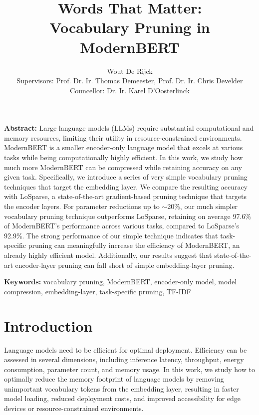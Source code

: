\documentclass[twocolumn]{article}
\title{\vspace{-1.5cm}\huge \textbf{Words That Matter:\\ Vocabulary Pruning in ModernBERT}}
\author{
Wout De Rijck\\[0.5em]
\small{Supervisors:} \normalsize Prof. Dr. Ir. Thomas Demeester, \normalsize Prof. Dr. Ir. Chris Develder\\
\small{Councellor:} \normalsize Dr. Ir. Karel D'Oosterlinck
}
\date{} %
\begin{document}
\maketitle


\textbf{Abstract:} Large language models (LLMs) require substantial computational and memory resources, limiting their utility in resource-constrained environments. 
ModernBERT is a smaller encoder-only language model that excels at various tasks while being computationally highly efficient. 
In this work, we study how much more ModernBERT can be compressed while retaining accuracy on any given task.
Specifically, we introduce a series of very simple vocabulary pruning techniques that target the embedding layer. We compare the resulting accuracy with LoSparse, a state-of-the-art gradient-based pruning technique that targets the encoder layers.
For parameter reductions up to $\sim$20\%, our much simpler vocabulary pruning technique outperforms LoSparse, retaining on average 97.6\% of ModernBERT's performance across various tasks, compared to LoSparse's 92.9\%.
The strong performance of our simple technique indicates that task-specific pruning can meaningfully increase the efficiency of ModernBERT, an already highly efficient model. Additionally, our results suggest that state-of-the-art encoder-layer pruning can fall short of simple embedding-layer pruning.


\textbf{Keywords:} vocabulary pruning, ModernBERT, encoder-only model, model compression, embedding-layer, task-specific pruning, TF-IDF

\section{Introduction}
Language models need to be efficient for optimal deployment.
Efficiency can be assessed in several dimensions, including inference latency, throughput, energy consumption, parameter count, and memory usage.
In this work, we study how to optimally reduce the memory footprint of language models by removing unimportant vocabulary tokens from the embedding layer, resulting in faster model loading, reduced deployment costs, and improved accessibility for edge devices or resource-constrained environments.
\end{document}
